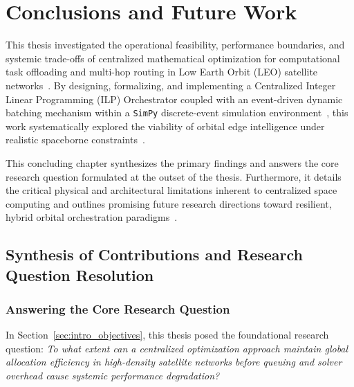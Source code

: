 \chapter{Conclusions and Future Work}
\label{chap:conclusions}

This thesis investigated the operational feasibility, performance boundaries, and systemic trade-offs of centralized mathematical optimization for computational task offloading and multi-hop routing in Low Earth Orbit (LEO) satellite networks~\cite{survey_orbital_edge_2023, icdcs_satellite_2025}. By designing, formalizing, and implementing a Centralized Integer Linear Programming (ILP) Orchestrator coupled with an event-driven dynamic batching mechanism within a \texttt{SimPy} discrete-event simulation environment~\cite{simpy2023}, this work systematically explored the viability of orbital edge intelligence under realistic spaceborne constraints~\cite{denby2019orbital, icdcs_satellite_2025}.

This concluding chapter synthesizes the primary findings and answers the core research question formulated at the outset of the thesis. Furthermore, it details the critical physical and architectural limitations inherent to centralized space computing and outlines promising future research directions toward resilient, hybrid orbital orchestration paradigms~\cite{denby2020asplos, survey_orbital_edge_2023, tiansuan2023}.

\section{Synthesis of Contributions and Research Question Resolution}
\label{sec:concl_synthesis}

\subsection{Answering the Core Research Question}
\label{subsec:concl_rq_resolution}

In Section~\ref{sec:intro_objectives}, this thesis posed the foundational research question: \textit{To what extent can a centralized optimization approach maintain global allocation efficiency in high-density satellite networks before queuing and solver overhead cause systemic performance degradation?}


